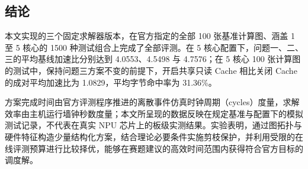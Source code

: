\documentclass[anonymous,withtoc]{gmcm2026}
\begin{document}
\subsection{结论}

本文实现的三个固定求解器版本，在官方指定的全部 100 张基准计算图、涵盖 1 至 5 核心的 1500 种测试组合上完成了全部评测。在 5 核心配置下，问题一、二、三的平均基线加速比分别达到 4.0553、4.5498 与 4.7576；在 5 核心 100 张计算图的测试中，保持问题三方案不变的前提下，开启共享只读 Cache 相比关闭 Cache 的成对平均加速比为 1.0829，平均字节命中率为 31.36\%。

方案完成时间由官方评测程序推进的离散事件仿真时钟周期（cycles）度量，求解效率由主机运行墙钟秒数度量；本文所呈现的数据反映在规定基准与配置下的模拟测试记录，不代表在真实 NPU 芯片上的板级实测结果。实验表明，通过图拓扑与硬件特征构造少量结构化方案，结合理论必要条件实施剪枝保护，并利用受限的在线评测预算进行比较择优，能够在赛题建议的高效时间范围内获得符合官方目标的调度解。
\end{document}
